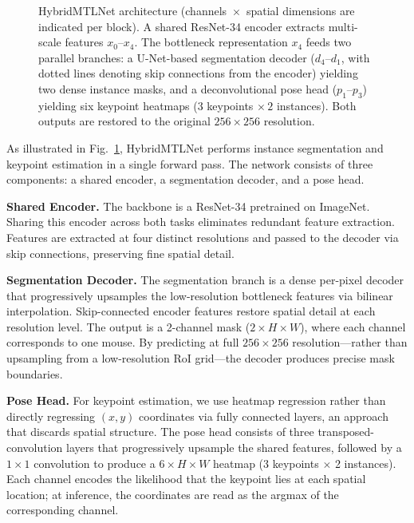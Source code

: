 \documentclass[runningheads]{llncs}
\begin{document}
\begin{figure}[t]
{%
  }
  \caption{HybridMTLNet architecture (channels~$\times$~spatial
  dimensions are indicated per block). A shared ResNet-34 encoder
  extracts multi-scale features $x_0$--$x_4$. The bottleneck
  representation $x_4$ feeds two parallel branches: a U-Net-based
  segmentation decoder ($d_4$--$d_1$, with dotted lines denoting skip
  connections from the encoder) yielding two dense instance masks, and a
  deconvolutional pose head ($p_1$--$p_3$) yielding six keypoint heatmaps
  ($3$ keypoints $\times\,2$ instances). Both outputs are restored to the
  original $256{\times}256$ resolution.}
  \label{fig:arch}
\end{figure}

As illustrated in Fig.~\ref{fig:arch}, HybridMTLNet performs
instance segmentation and keypoint estimation in a single forward
pass. The network consists of three components: a shared encoder,
a segmentation decoder, and a pose head.

\noindent\textbf{Shared Encoder.}
The backbone is a ResNet-34 \cite{he2016resnet} pretrained on
ImageNet. Sharing this encoder across both tasks eliminates
redundant feature extraction. Features are extracted at four
distinct resolutions and passed to the decoder via skip
connections, preserving fine spatial detail.

\noindent\textbf{Segmentation Decoder.}
The segmentation branch is a dense per-pixel decoder
\cite{ronneberger2015unet} that progressively upsamples the
low-resolution bottleneck features via bilinear interpolation.
Skip-connected encoder features restore spatial detail at each
resolution level. The output is a 2-channel mask
($2 \times H \times W$), where each channel corresponds to one
mouse. By predicting at full $256\times256$ resolution---rather
than upsampling from a low-resolution RoI grid---the decoder
produces precise mask boundaries.

\noindent\textbf{Pose Head.}
For keypoint estimation, we use heatmap regression rather than
directly regressing $(x,y)$ coordinates via fully connected
layers, an approach that discards spatial structure. The pose
head consists of three transposed-convolution layers that
progressively upsample the shared features, followed by a
$1\times1$ convolution to produce a $6 \times H \times W$
heatmap (3 keypoints $\times$ 2 instances). Each channel
encodes the likelihood that the keypoint lies at each spatial
location; at inference, the coordinates are read as the argmax
of the corresponding channel.
\end{document}
